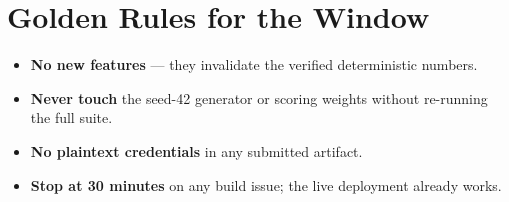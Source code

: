\documentclass[11pt,a4paper]{article}
\begin{document}
\section{Golden Rules for the Window}
\label{sec:rules}

\begin{itemize}[leftmargin=1.5em]
  \item \textbf{No new features} --- they invalidate the verified deterministic numbers.
  \item \textbf{Never touch} the seed-42 generator or scoring weights without re-running the
        full suite.
  \item \textbf{No plaintext credentials} in any submitted artifact.
  \item \textbf{Stop at 30 minutes} on any build issue; the live deployment already works.
\end{itemize}
\end{document}
